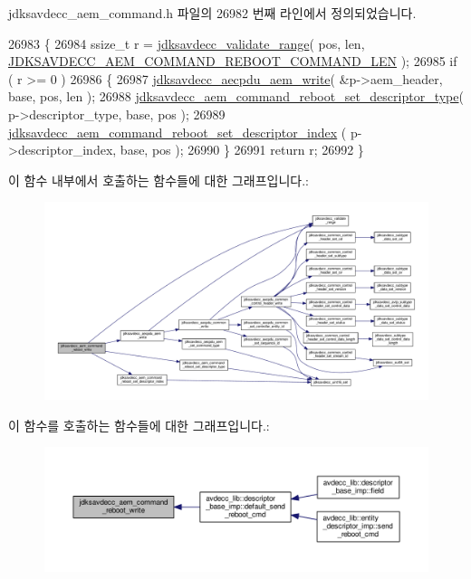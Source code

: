 jdksavdecc\+\_\+aem\+\_\+command.\+h 파일의 26982 번째 라인에서 정의되었습니다.


\begin{DoxyCode}
26983 \{
26984     ssize\_t r = \hyperlink{group__util_ga9c02bdfe76c69163647c3196db7a73a1}{jdksavdecc\_validate\_range}( pos, len, 
      \hyperlink{group__command__reboot_gaf5f6dbe8949b2bb7db6ad9e25e8bddf1}{JDKSAVDECC\_AEM\_COMMAND\_REBOOT\_COMMAND\_LEN} );
26985     \textcolor{keywordflow}{if} ( r >= 0 )
26986     \{
26987         \hyperlink{group__aecpdu__aem_gad658e55771cce77cecf7aae91e1dcbc5}{jdksavdecc\_aecpdu\_aem\_write}( &p->aem\_header, base, pos, len );
26988         \hyperlink{group__command__reboot_gaaa29b5bdf032a6326fc121ddb06ab0bd}{jdksavdecc\_aem\_command\_reboot\_set\_descriptor\_type}(
       p->descriptor\_type, base, pos );
26989         \hyperlink{group__command__reboot_gae8fd6bfa84299e6c5949e87035246a18}{jdksavdecc\_aem\_command\_reboot\_set\_descriptor\_index}
      ( p->descriptor\_index, base, pos );
26990     \}
26991     \textcolor{keywordflow}{return} r;
26992 \}
\end{DoxyCode}


이 함수 내부에서 호출하는 함수들에 대한 그래프입니다.\+:
\nopagebreak
\begin{figure}[H]
\begin{center}
\leavevmode
\includegraphics[width=350pt]{group__command__reboot_ga47e876f80dcc650ced15fa1579fece63_cgraph}
\end{center}
\end{figure}




이 함수를 호출하는 함수들에 대한 그래프입니다.\+:
\nopagebreak
\begin{figure}[H]
\begin{center}
\leavevmode
\includegraphics[width=350pt]{group__command__reboot_ga47e876f80dcc650ced15fa1579fece63_icgraph}
\end{center}
\end{figure}


